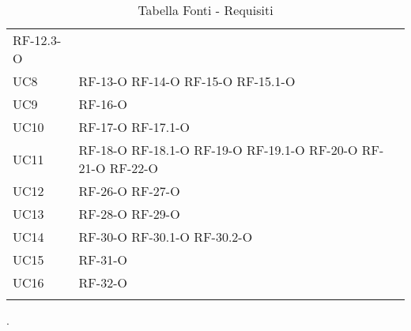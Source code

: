 \begin{longtable}{ 
		>{}p{} 
		>{}p{} }
	RF-12.3-O	\tabularnewline
UC8 &
	RF-13-O		\newline
	RF-14-O		\newline
	RF-15-O		\newline
	RF-15.1-O	\tabularnewline
UC9 &
	RF-16-O		\tabularnewline
UC10 &
	RF-17-O		\newline
	RF-17.1-O	\tabularnewline
UC11 &
	RF-18-O		\newline
	RF-18.1-O	\newline
	RF-19-O		\newline
	RF-19.1-O	\newline
	RF-20-O		\newline
	RF-21-O		\newline
	RF-22-O		\tabularnewline
UC12 &
	RF-26-O		\newline
	RF-27-O		\tabularnewline
UC13 &
	RF-28-O		\newline
	RF-29-O		\tabularnewline
UC14 &
	RF-30-O		\newline
	RF-30.1-O	\newline
	RF-30.2-O	\tabularnewline
UC15 &
	RF-31-O		\tabularnewline
UC16 &
	RF-32-O		\tabularnewline
\caption{Tabella Fonti - Requisiti\label{ Tabella Fonti - Requisiti}}
\end{longtable}.
\pagebreak
